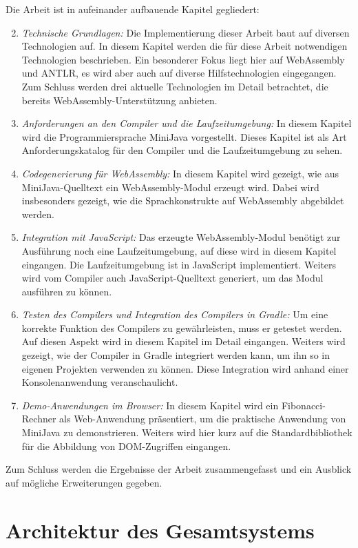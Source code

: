Die Arbeit ist in aufeinander aufbauende Kapitel gegliedert:
\begin{enumerate}
    \setcounter{enumi}{1}
    \item \emph{Technische Grundlagen:} Die Implementierung dieser Arbeit baut auf diversen Technologien auf. In diesem Kapitel werden die für diese Arbeit notwendigen Technologien beschrieben. Ein besonderer Fokus liegt hier auf WebAssembly und ANTLR, es wird aber auch auf diverse Hilfstechnologien eingegangen. Zum Schluss werden drei aktuelle Technologien im Detail betrachtet, die bereits WebAssembly-Unterstützung anbieten.
    \item \emph{Anforderungen an den Compiler und die Laufzeitumgebung:} In diesem Kapitel wird die Programmiersprache MiniJava vorgestellt. Dieses Kapitel ist als Art Anforderungskatalog für den Compiler und die Laufzeitumgebung zu sehen.
    \item \emph{Codegenerierung für WebAssembly:} In diesem Kapitel wird gezeigt, wie aus Mi\-ni\-Ja\-va-Quell\-text ein WebAssembly-Modul erzeugt wird. Dabei wird insbesonders gezeigt, wie die Sprachkonstrukte auf WebAssembly abgebildet werden. 
    \item \emph{Integration mit JavaScript:} Das erzeugte WebAssembly-Modul benötigt zur Ausführung noch eine Laufzeitumgebung, auf diese wird in diesem Kapitel eingangen. Die Laufzeitumgebung ist in JavaScript implementiert. Weiters wird vom Compiler auch JavaScript-Quelltext generiert, um das Modul ausführen zu können.
    \item \emph{Testen des Compilers und Integration des Compilers in Gradle:} Um eine korrekte Funktion des Compilers zu gewährleisten, muss er getestet werden. Auf diesen Aspekt wird in diesem Kapitel im Detail eingangen. Weiters wird gezeigt, wie der Compiler in Gradle integriert werden kann, um ihn so in eigenen Projekten verwenden zu können. Diese Integration wird anhand einer Konsolenanwendung veranschaulicht.
    \item \emph{Demo-Anwendungen im Browser:} In diesem Kapitel wird ein Fibonacci-Rechner als Web-Anwendung präsentiert, um die praktische Anwendung von MiniJava zu demonstrieren. Weiters wird hier kurz auf die Standardbibliothek für die Abbildung von DOM-Zugriffen eingangen.
\end{enumerate}

Zum Schluss werden die Ergebnisse der Arbeit zusammengefasst und ein Ausblick auf mögliche Erweiterungen gegeben.

\section{Architektur des Gesamtsystems}

